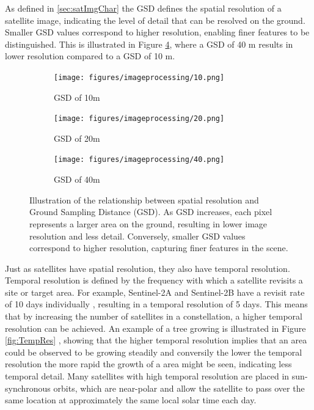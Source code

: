 
\noindent
\noindent
As defined in \ref{sec:satImgChar} the GSD defines the spatial resolution of a satellite image, indicating the level of detail that can be resolved on the ground. Smaller GSD values correspond to higher resolution, enabling finer features to be distinguished. This is illustrated in Figure \ref{fig:GSD_all}, where a GSD of 40 m results in lower resolution compared to a GSD of 10 m.


\begin{figure}[H]
    \centering
    \begin{subfigure}[b]{0.32\linewidth}
        \centering
        \texttt{[image: figures/imageprocessing/10.png]}
        \caption{GSD of 10m}
        \label{fig:GSD1}
    \end{subfigure}
    \hfill
    \begin{subfigure}[b]{0.32\linewidth}
        \centering
        \texttt{[image: figures/imageprocessing/20.png]}
        \caption{GSD of 20m}
        \label{fig:GSD2}
    \end{subfigure}
    \hfill
    \begin{subfigure}[b]{0.32\linewidth}
        \centering
        \texttt{[image: figures/imageprocessing/40.png]}
        \caption{GSD of 40m}
        \label{fig:GSD3}
    \end{subfigure}
    \caption{Illustration of the relationship between spatial resolution and Ground Sampling Distance (GSD). As GSD increases, each pixel represents a larger area on the ground, resulting in lower image resolution and less detail. Conversely, smaller GSD values correspond to higher resolution, capturing finer features in the scene.}
    \label{fig:GSD_all}
\end{figure}

\noindent
Just as satellites have spatial resolution, they also have temporal resolution. Temporal resolution is defined by the frequency with which a satellite 
revisits a site or target area. For example, Sentinel-2A and Sentinel-2B have a revisit rate of 10 days individually \cite{Wang}, 
resulting in a temporal resolution of 5 days. This means that by increasing the number of satellites in a constellation, a higher temporal resolution can be 
achieved. An example of a tree growing is illustrated in Figure \ref{fig:TempRes} \cite{Tree}, showing that the higher temporal resolution implies that an area could be observed to be growing steadily and conversily the lower the temporal resolution the more rapid the growth of a area might be seen, indicating less temporal detail. Many satellites with high temporal resolution are placed in sun-synchronous orbits, which are near-polar and allow the satellite to pass over the same location at approximately the same local solar time each day.

